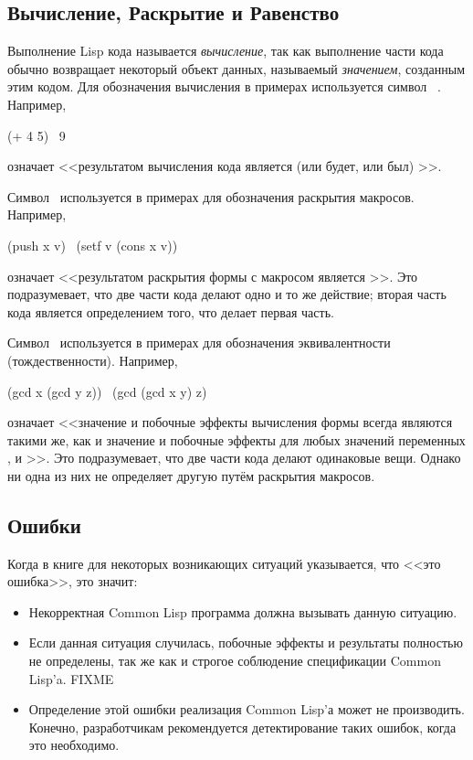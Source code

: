 \subsection{Вычисление, Раскрытие и Равенство}

Выполнение Lisp кода называется \emph{вычисление}, так как выполнение части кода
обычно возвращает некоторый объект данных, называемый \emph{значением}, созданным
этим кодом. Для обозначения вычисления в примерах используется символ \EV\ .
Например,
\begin{lisp}
(+ 4 5) \EV\ 9
\end{lisp}
означает <<результатом вычисления кода  является (или будет, или был)
>>.

Символ \EX\ используется в примерах для обозначения раскрытия макросов.
Например,
\begin{lisp}
(push x v) \EX\ (setf v (cons x v))
\end{lisp}
означает <<результатом раскрытия формы с макросом 
является >>. Это подразумевает, что две части кода
делают одно и то же действие; вторая часть кода является определением того, что
делает первая часть.

Символ \EQ\ используется в примерах для обозначения эквивалентности
(тождественности).
Например,
\begin{lisp}
(gcd x (gcd y z)) \EQ\ (gcd (gcd x y) z)
\end{lisp}
означает <<значение и побочные эффекты вычисления формы  всегда
являются такими же, как и значение и побочные эффекты  для любых
значений переменных ,  и >>.
Это подразумевает, что две части кода делают одинаковые вещи. Однако ни одна из
них не определяет другую путём раскрытия макросов.

\subsection{Ошибки}
\label{INTRO-ERRORS}

Когда в книге для некоторых возникающих ситуаций указывается, что <<это
ошибка>>, это значит: 

\begin{itemize}
\item Некорректная Common Lisp программа должна вызывать данную ситуацию.

\item Если данная ситуация случилась, побочные эффекты и результаты полностью не
определены, так же как и строгое соблюдение спецификации Common Lisp'a. FIXME

\item Определение этой ошибки реализация Common Lisp'а может не
  производить. Конечно, разработчикам рекомендуется детектирование таких ошибок,
  когда это необходимо. 
\end{itemize}

